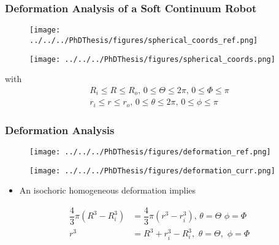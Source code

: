 \begin{frame}
	\frametitle{Deformation Analysis of a Soft Continuum Robot}
	\begin{figure}[!tb]
		\centering
		\begin{minipage}[b]{0.45\textwidth}
			\texttt{[image: ../../../PhDThesis/figures/spherical\_coords\_ref.png]}
		\end{minipage}
		\hfill
		\begin{minipage}[b]{0.50\textwidth}
			\texttt{[image: ../../../PhDThesis/figures/spherical\_coords.png]}
		\end{minipage}
		\label{fig:spherical_coords}
	\end{figure}
	with
	\begin{align}
	R_i \le R \le R_o, \, 0 \le \Theta \le 2\pi, \, 0 \le \Phi \le \pi  \nonumber \\
 	r_i \le r \le r_o, \, 0 \le \theta \le 2\pi,  \, 0 \le \phi \le \pi
	\label{eq:polar_coordinates_ref}
	\end{align}
\end{frame}


\begin{frame}
\frametitle{Deformation Analysis}
%
\begin{figure}[!tb]
	\centering
	\begin{minipage}[b]{0.45\textwidth}
		\texttt{[image: ../../../PhDThesis/figures/deformation\_ref.png]}
	\end{minipage}
	\hfill
	\begin{minipage}[b]{0.5\textwidth}
		\texttt{[image: ../../../PhDThesis/figures/deformation\_curr.png]}
	\end{minipage}
	\label{fig:radii_change}
\end{figure}
%
\begin{itemize}
	\item  An isochoric homogeneous deformation implies
\end{itemize}
%
\begin{align}
\dfrac{4}{3}\pi\left(R^3 - R_i^3\right) &= \dfrac{4}{3}\pi\left(r^3 - r_i^3\right),\,\theta = \Theta \,\, \phi = \Phi \nonumber \\
	 r^3 &= R^3 + r_i^3 - R_i^3, \,\, \theta = \Theta, \,\, \phi = \Phi
\label{eq:spherical_transformation}
\end{align}
\end{frame}

